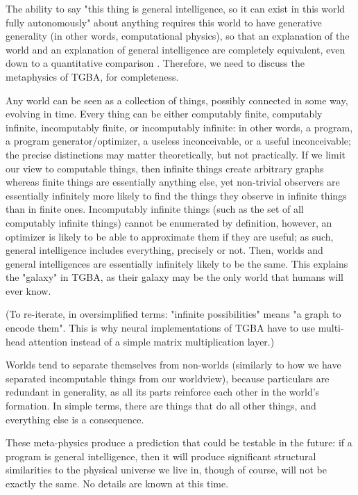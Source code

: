 \documentclass{article}
\begin{document}
The ability to say "this thing is general intelligence, so it can exist in this world fully autonomously" about anything requires this world to have generative generality (in other words, computational physics), so that an explanation of the world and an explanation of general intelligence are completely equivalent, even down to a quantitative comparison \cite{10.3389/fphy.2020.525731}. Therefore, we need to discuss the metaphysics of TGBA, for completeness.

Any world can be seen as a collection of things, possibly connected in some way, evolving in time. Every thing can be either computably finite, computably infinite, incomputably finite, or incomputably infinite: in other words, a program, a program generator/optimizer, a useless inconceivable, or a useful inconceivable; the precise distinctions may matter theoretically, but not practically. If we limit our view to computable things, then infinite things create arbitrary graphs whereas finite things are essentially anything else, yet non-trivial observers are essentially infinitely more likely to find the things they observe in infinite things than in finite ones. Incomputably infinite things (such as the set of all computably infinite things) cannot be enumerated by definition, however, an optimizer is likely to be able to approximate them if they are useful; as such, general intelligence includes everything, precisely or not. Then, worlds and general intelligences are essentially infinitely likely to be the same. This explains the "galaxy" in TGBA, as their galaxy may be the only world that humans will ever know.

(To re-iterate, in oversimplified terms: "infinite possibilities" means "a graph to encode them". This is why neural implementations of TGBA have to use multi-head attention instead of a simple matrix multiplication layer.)

Worlds tend to separate themselves from non-worlds (similarly to how we have separated incomputable things from our worldview), because particulars are redundant in generality, as all its parts reinforce each other in the world's formation. In simple terms, there are things that do all other things, and everything else is a consequence.

These meta-physics produce a prediction that could be testable in the future: if a program is general intelligence, then it will produce significant structural similarities to the physical universe we live in, though of course, will not be exactly the same. No details are known at this time.
\end{document}

